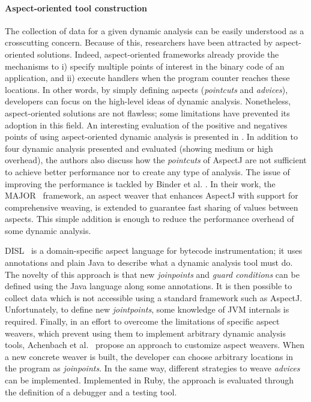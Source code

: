 \paragraph{Aspect-oriented tool construction}
The collection of data for a given dynamic analysis can be easily understood as a crosscutting concern.
Because of this, researchers have been attracted by aspect-oriented solutions.
Indeed, aspect-oriented frameworks already provide the mechanisms to i) specify multiple points of interest in the binary code of an application, and ii) execute handlers when the program counter reaches these locations.
In other words, by simply defining aspects (\textit{pointcuts} and \textit{advices}), developers can focus on the high-level ideas of dynamic analysis.
Nonetheless, aspect-oriented solutions are not flawless; some limitations have prevented its adoption in this field.
An interesting evaluation of the positive and negatives points of using aspect-oriented dynamic analysis is presented in \cite{Pearce:2007:PA:1248445.1248448}.
In addition to four dynamic analysis presented and evaluated (showing medium or high overhead), the authors also discuss how the \textit{pointcuts} of AspectJ are not sufficient to achieve better performance nor to create any type of analysis.
The issue of improving the performance is tackled by Binder et al. \cite{Binder:2006:FEM:1173706.1173733}.
In their work, the MAJOR~\cite{Villazon20111015} framework, an aspect weaver that enhances AspectJ with support for comprehensive weaving, is extended to guarantee fast sharing of values between aspects.
This simple addition is enough to reduce the performance overhead of some dynamic analysis.

DISL~\cite{Marek:2012:DEL:2162037.2162046,Marek2012} is a domain-specific aspect language for bytecode instrumentation; it uses annotations and plain Java to describe what a dynamic analysis tool must do.
The novelty of this approach is that new \textit{joinpoints} and \textit{guard conditions} can be defined using the Java language along some annotations.
It is then possible to collect data which is not accessible using a standard framework such as AspectJ.
Unfortunately, to define new \textit{jointpoints}, some knowledge of JVM internals is required.
Finally, in an effort to overcome the limitations of specific aspect weavers, which prevent using them to implement arbitrary dynamic analysis tools, Achenbach et al.~\cite{Achenbach:2010:MPD:1939399.1939415} propose an approach to customize aspect weavers.
When a new concrete weaver is built, the developer can choose arbitrary locations in the program as \textit{joinpoints}.
In the same way, different strategies to weave \textit{advices} can be implemented.
Implemented in Ruby, the approach is evaluated through the definition of a debugger and a testing tool.

